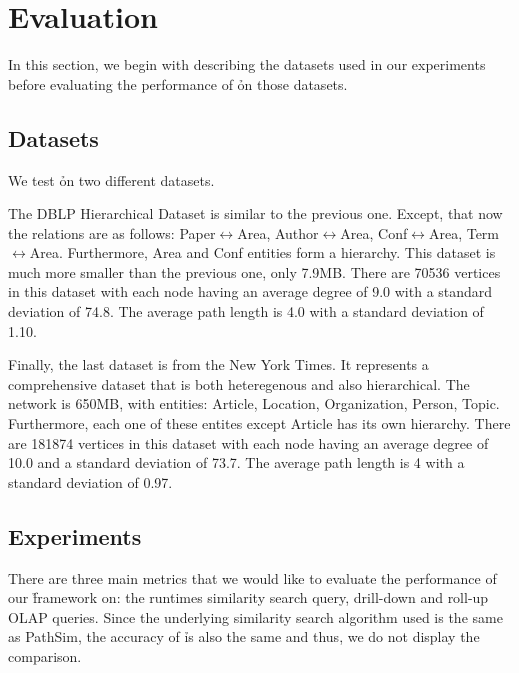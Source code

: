 \section{Evaluation}
\label{sec:eval}

In this section, we begin with describing the datasets used in our experiments
before evaluating the performance of \h on those datasets.

\subsection{Datasets}

We test \h on two different datasets.


The DBLP Hierarchical Dataset is similar to the previous one. Except, that now
the relations are as follows: Paper$\leftrightarrow$Area,
Author$\leftrightarrow$Area, Conf$\leftrightarrow$Area,
Term$\leftrightarrow$Area.  Furthermore, Area and Conf entities form a
hierarchy.  This dataset is much more smaller than the previous one, only
7.9MB. There are 70536 vertices in this dataset with each node having
an average degree of 9.0 with a standard deviation of 74.8. The average
path length is 4.0 with a standard deviation of 1.10.

Finally, the last dataset is from the New York Times. It represents a
comprehensive dataset that is both heteregenous and also hierarchical. The
network is 650MB, with entities: Article, Location, Organization, Person,
Topic. Furthermore, each one of these entites except Article has its own
hierarchy. There are 181874 vertices in this dataset with each node having an
average degree of 10.0 and a standard deviation of 73.7. The average path length
is 4 with a standard deviation of 0.97.

\subsection {Experiments}

There are three main metrics that we would like to evaluate the performance of
our \h framework on: the runtimes similarity search query, drill-down and
roll-up OLAP queries. Since the underlying similarity search algorithm used is
the same as PathSim, the accuracy of \h is also the same and thus, we do not
display the comparison.

